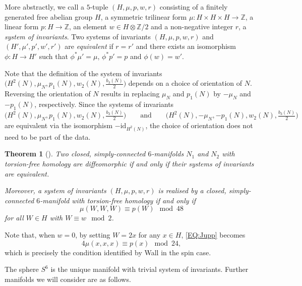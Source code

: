 \documentclass[pdftex]{sigma}
\numberwithin{equation}{section}
\newtheorem{Theorem}{Theorem}[section]
\theoremstyle{definition}
\numberwithin{table}{section}
\newcommand{\Z}{\mathbb{Z}}
\begin{document}
More abstractly, we call a $5$-tuple $(H,\mu,p,w,r)$ consisting of a finitely generated free abelian group $H$, a symmetric trilinear form $\mu\colon H\times H \times H\to \Z$, a linear form $p\colon H\to \Z$, an element $w\in H\otimes\Z/2$ and a non-negative integer $r$, a \emph{system of invariants}. Two systems of invariants $(H,\mu,p,w,r)$ and $(H',\mu',p',w',r')$ are \emph{equivalent} if $r=r'$ and there exists an isomorphism $\phi\colon H\to H'$ such that $\phi^*\mu'=\mu$, $\phi^* p'=p$ and $\phi(w)=w'$.

Note that the definition of the system of invariants $\bigl(H^2(N),\mu_N,p_1(N),w_2(N),\frac{b_3(N)}{2}\bigr)$ depends on a choice of orientation of $N$. Reversing the orientation of $N$ results in replacing $\mu_N$ and $p_1(N)$ by $-\mu_N$ and $-p_1(N)$, respectively. Since the systems of invariants
\[\Big(H^2(N),\mu_N,p_1(N),w_2(N),\tfrac{b_3(N)}{2}\Big)\qquad \text{and}\qquad \Big(H^2(N),-\mu_N,-p_1(N),w_2(N),\tfrac{b_3(N)}{2}\Big)\]
are equivalent via the isomorphism $-\mathrm{id}_{H^2(N)}$, the choice of orientation does not need to be part of the data.

\begin{Theorem}[{\cite{Ju73}}]\label{T:Jupp}
	Two closed, simply-connected $6$-manifolds $N_1$ and $N_2$ with torsion-free homology are diffeomorphic if and only if their systems of invariants are equivalent.
	
	Moreover, a system of invariants $(H,\mu,p,w,r)$ is realised by a closed, simply-connected $6$-manifold with torsion-free homology if and only if
	\begin{equation}\label{EQ:Jupp}
		\mu(W,W,W)\equiv p(W)\mod 48
	\end{equation}
	for all $W\in H$ with $W\equiv w\mod 2$.
\end{Theorem}
Note that, when $w=0$, by setting $W=2x$ for any $x\in H$, \eqref{EQ:Jupp} becomes
\begin{equation}\label{EQ:Wall}
	4\mu(x,x,x)\equiv p(x)\mod 24,
\end{equation}
which is precisely the condition identified by Wall \cite[Theorem 5]{Wa66} in the spin case.

The sphere $S^6$ is the unique manifold with trivial system of invariants. Further manifolds we will consider are as follows.
\end{document}
